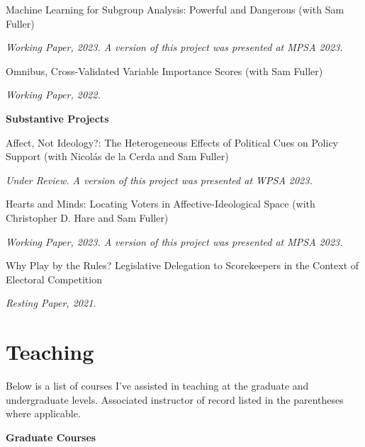 \documentclass[
  11pt,
]
{article}
\providecommand{\tightlist}{%
  \setlength{\itemsep}{0pt}\setlength{\parskip}{0pt}}
\renewenvironment{itemize}{
  \begin{list}{}{
    \setlength{\leftmargin}{1.5em}
  }
}{
  \end{list}
}
\begin{document}
Machine Learning for Subgroup Analysis: Powerful and Dangerous (with Sam
Fuller)

\begin{itemize}
\tightlist
\item
  \emph{Working Paper, 2023. A version of this project was presented at
  MPSA 2023.}
\end{itemize}

Omnibus, Cross-Validated Variable Importance Scores (with Sam Fuller)

\begin{itemize}
\tightlist
\item
  \emph{Working Paper, 2022.}
\end{itemize}

\textbf{Substantive Projects}

Affect, Not Ideology?: The Heterogeneous Effects of Political Cues on
Policy Support (with Nicolás de la Cerda and Sam Fuller)

\begin{itemize}
\tightlist
\item
  \emph{Under Review. A version of this project was presented at WPSA
  2023.}
\end{itemize}

Hearts and Minds: Locating Voters in Affective-Ideological Space (with
Christopher D. Hare and Sam Fuller)

\begin{itemize}
\tightlist
\item
  \emph{Working Paper, 2023. A version of this project was presented at
  MPSA 2023.}
\end{itemize}

Why Play by the Rules? Legislative Delegation to Scorekeepers in the
Context of Electoral Competition

\begin{itemize}
\tightlist
\item
  \emph{Resting Paper, 2021.}
\end{itemize}

\hypertarget{teaching}{%
\section{Teaching}\label{teaching}}

Below is a list of courses I've assisted in teaching at the graduate and
undergraduate levels. Associated instructor of record listed in the
parentheses where applicable.

\textbf{Graduate Courses}
\end{document}
